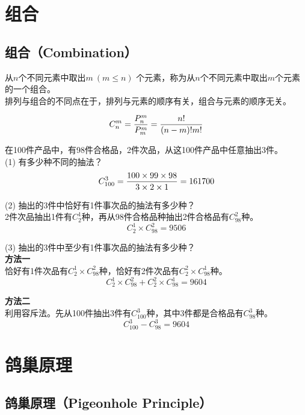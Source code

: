 \documentclass[12pt, openany, oneside]{book}
\begin{document}
\newpage

\section{组合}

\subsection{组合（Combination）}

从$ n $个不同元素中取出$ m\ (m \le n) $ 个元素，称为从$ n $个不同元素中取出$ m $个元素的一个组合。\\

排列与组合的不同点在于，排列与元素的顺序有关，组合与元素的顺序无关。

\vspace{-1cm}

\begin{align}
	C_n^m = {P_n^m \over P_m^m} = {n! \over (n-m)!m!}
\end{align}

\begin{tcolorbox}
	在100件产品中，有98件合格品，2件次品，从这100件产品中任意抽出3件。\\
	(1) 有多少种不同的抽法？
	$$
		C_{100}^3 = {100 \times 99 \times 98 \over 3 \times 2 \times 1} = 161700
	$$

	(2) 抽出的3件中恰好有1件事次品的抽法有多少种？\\
	2件次品抽出1件有$ C_2^1 $种，再从98件合格品种抽出2件合格品有$ C_{98}^2 $种。
	$$
		C_2^1 \times C_{98}^2 = 9506
	$$

	(3) 抽出的3件中至少有1件事次品的抽法有多少种？\\
	\textbf{方法一}\\
	恰好有1件次品有$ C_2^1 \times C_{98}^2 $种，恰好有2件次品有$ C_2^2 \times C_{98}^1 $种。
	$$
		C_2^1 \times C_{98}^2 + C_2^2 \times C_{98}^1 = 9604
	$$

	\textbf{方法二}\\
	利用容斥法。先从100件抽出3件有$ C_{100}^3 $种，其中3件都是合格品有$ C_{98}^3 $种。
	$$
		C_{100}^3 - C_{98}^3 = 9604
	$$
\end{tcolorbox}

\newpage

\section{鸽巢原理}

\subsection{鸽巢原理（Pigeonhole Principle）}
\end{document}
